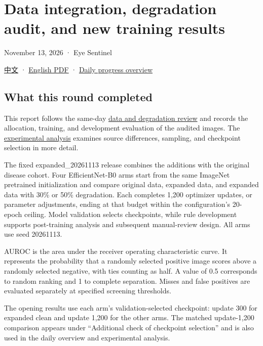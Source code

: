 \documentclass[
  10pt,
]{article}
\author{}
\date{}
\begin{document}
\section{Data integration, degradation audit, and new training
results}\label{data-integration-degradation-audit-and-new-training-results}

November 13, 2026 · Eye Sentinel

\href{training-results.zh.md}{中文} ·
\href{training-results.en.pdf}{English PDF} ·
\href{../progress-overview.en.md}{Daily progress overview}

\subsection{What this round completed}\label{what-this-round-completed}

This report follows the same-day
\href{../data-review/data-and-degradation-review.en.md}{data and
degradation review} and records the allocation, training, and
development evaluation of the audited images. The
\href{../experimental-analysis/experimental-analysis.en.md}{experimental
analysis} examines source differences, sampling, and checkpoint
selection in more detail.

The fixed expanded\_20261113 release combines the additions with the
original disease cohort. Four EfficientNet-B0 arms start from the same
ImageNet pretrained initialization and compare original data, expanded
data, and expanded data with 30\% or 50\% degradation. Each completes
1,200 optimizer updates, or parameter adjustments, ending at that budget
within the configuration's 20-epoch ceiling. Model validation selects
checkpoints, while rule development supports post-training analysis and
subsequent manual-review design. All arms use seed 20261113.

AUROC is the area under the receiver operating characteristic curve. It
represents the probability that a randomly selected positive image
scores above a randomly selected negative, with ties counting as half. A
value of 0.5 corresponds to random ranking and 1 to complete separation.
Misses and false positives are evaluated separately at specified
screening thresholds.

The opening results use each arm's validation-selected checkpoint:
update 300 for expanded clean and update 1,200 for the other arms. The
matched update-1,200 comparison appears under ``Additional check of
checkpoint selection'' and is also used in the daily overview and
experimental analysis.
\end{document}
